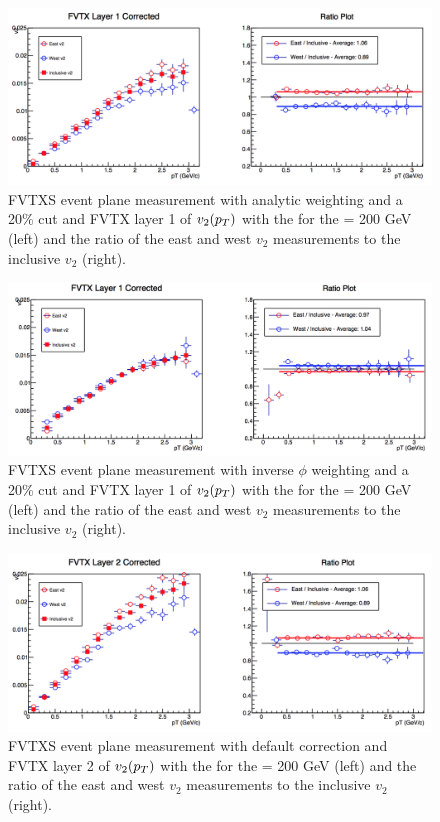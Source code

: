 \begin{figure}

\includegraphics[width=0.65\linewidth]{figs/fvtx_1_analytic.png}
\caption{FVTXS event plane measurement with analytic weighting and a 20\% cut and FVTX layer 1 of $v_{2}(\mbox{$p_T$})$ with the  for the \pau \sqsn = 200 GeV (left) and the ratio of the east and west $v_2$ measurements to the inclusive $v_2$ (right).}
\end{figure}

\begin{figure}

\includegraphics[width=0.65\linewidth]{figs/fvtx_1_data_cut.png}
\caption{FVTXS event plane measurement with inverse $\phi$ weighting and a 20\% cut and FVTX layer 1 of $v_{2}(\mbox{$p_T$})$ with the  for the \pau \sqsn = 200 GeV (left) and the ratio of the east and west $v_2$ measurements to the inclusive $v_2$ (right).}
\end{figure}

\begin{figure}

\includegraphics[width=0.65\linewidth]{figs/fvtx_2_default.png}
\caption{FVTXS event plane measurement with default correction and FVTX layer 2 of $v_{2}(\mbox{$p_T$})$ with the  for the \pau \sqsn = 200 GeV (left) and the ratio of the east and west $v_2$ measurements to the inclusive $v_2$ (right).}
\end{figure}

